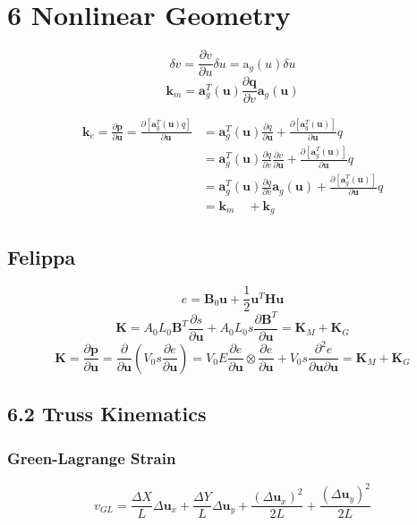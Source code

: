 \hypertarget{nonlinear-geometry}{%
\section{6 Nonlinear Geometry}\label{nonlinear-geometry}}

\[\delta v=\frac{\partial v}{\partial u} \delta u=\mathrm{a}_{g}(u) \delta u\]
\[\mathbf{k}_{m}=\mathbf{a}_{g}^{T}(\boldsymbol{u}) \frac{\partial \boldsymbol{q}}{\partial v} \mathbf{a}_{g}(\boldsymbol{u})\]

\[\begin{aligned}
\mathbf{k}_{e}=\frac{\partial \boldsymbol{p}}{\partial \boldsymbol{u}}=\frac{\partial\left[\mathbf{a}_{g}^{T}(\boldsymbol{u}) q\right]}{\partial \boldsymbol{u}} &=\mathbf{a}_{g}^{T}(\boldsymbol{u}) \frac{\partial q}{\partial \boldsymbol{u}}+\frac{\partial\left[\mathbf{a}_{g}^{T}(\boldsymbol{u})\right]}{\partial \boldsymbol{u}} q \\
&=\mathbf{a}_{g}^{T}(\boldsymbol{u}) \frac{\partial q}{\partial v} \frac{\partial v}{\partial \boldsymbol{u}}+\frac{\partial\left[\mathbf{a}_{g}^{T}(\boldsymbol{u})\right]}{\partial \boldsymbol{u}} q \\
&=\mathbf{a}_{g}^{T}(\boldsymbol{u}) \frac{\partial q}{\partial v} \mathbf{a}_{g}(\boldsymbol{u})+\frac{\partial\left[\mathbf{a}_{g}^{T}(\boldsymbol{u})\right]}{\partial \boldsymbol{u}} q \\
&=\mathbf{k}_{m} \quad+\mathbf{k}_{g}
\end{aligned}\]

\hypertarget{felippa}{%
\subsection{Felippa}\label{felippa}}

\[e=\mathbf{B}_{0} \mathbf{u}+\frac{1}{2} \mathbf{u}^{T} \mathbf{H} \mathbf{u}\]
\[\mathbf{K}=A_{0} L_{0} \mathbf{B}^{T} \frac{\partial s}{\partial \mathbf{u}}+A_{0} L_{0} s \frac{\partial \mathbf{B}^{T}}{\partial \mathbf{u}}=\mathbf{K}_{M}+\mathbf{K}_{G}\]
\[\mathbf{K}=\frac{\partial \mathbf{p}}{\partial \mathbf{u}}=\frac{\partial}{\partial \mathbf{u}}\left(V_{0} s \frac{\partial e}{\partial \mathbf{u}}\right)=V_{0} E \frac{\partial e}{\partial \mathbf{u}} \otimes \frac{\partial e}{\partial \mathbf{u}}+V_{0} s \frac{\partial^{2} e}{\partial \mathbf{u} \partial \mathbf{u}}=\mathbf{K}_{M}+\mathbf{K}_{G}\]

\hypertarget{truss-kinematics}{%
\subsection{6.2 Truss Kinematics}\label{truss-kinematics}}

\hypertarget{green-lagrange-strain}{%
\subsubsection{Green-Lagrange Strain}\label{green-lagrange-strain}}

\[v_{G L}=\frac{\Delta X}{L} \Delta \boldsymbol{u}_{x}+\frac{\Delta Y}{L} \Delta \boldsymbol{u}_{y}+\frac{\left(\Delta \boldsymbol{u}_{x}\right)^{2}}{2 L}+\frac{\left(\Delta \boldsymbol{u}_{y}\right)^{2}}{2 L}\]

